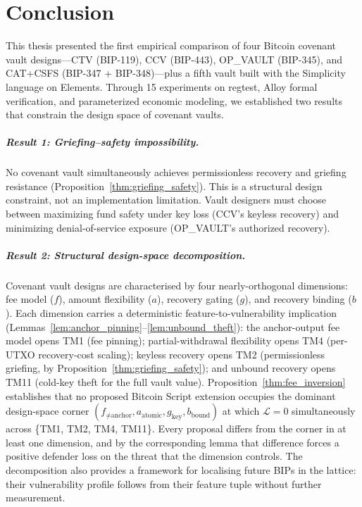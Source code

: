 \chapter{Conclusion} \label{ch:conclusion}

This thesis presented the first empirical comparison of four Bitcoin covenant vault
designs---CTV (BIP-119), CCV (BIP-443), OP\_VAULT (BIP-345), and CAT+CSFS
(BIP-347 + BIP-348)---plus a fifth vault built with the Simplicity language on
Elements. Through 15 experiments on regtest, Alloy formal verification, and
parameterized economic modeling, we established two results that constrain the
design space of covenant vaults.

\paragraph{Result 1: Griefing--safety impossibility.}
No covenant vault simultaneously achieves permissionless recovery and griefing
resistance (Proposition~\ref{thm:griefing_safety}). This is a structural design
constraint, not an implementation limitation. Vault designers must choose between
maximizing fund safety under key loss (CCV's keyless recovery) and minimizing
denial-of-service exposure (OP\_VAULT's authorized recovery).

\paragraph{Result 2: Structural design-space decomposition.}
Covenant vault designs are characterised by four nearly-orthogonal
dimensions: fee model ($f$), amount flexibility ($a$), recovery
gating ($g$), and recovery binding ($b$). Each dimension carries a
deterministic feature-to-vulnerability implication
(Lemmas~\ref{lem:anchor_pinning}--\ref{lem:unbound_theft}): the
anchor-output fee model opens TM1 (fee pinning); partial-withdrawal
flexibility opens TM4 (per-UTXO recovery-cost scaling); keyless recovery
opens TM2 (permissionless griefing, by
Proposition~\ref{thm:griefing_safety}); and unbound recovery opens
TM11 (cold-key theft for the full vault value).
Proposition~\ref{thm:fee_inversion} establishes that no proposed
Bitcoin Script extension occupies the dominant design-space corner
$(f_{\neq\text{anchor}}, a_{\text{atomic}}, g_{\text{key}},
b_{\text{bound}})$ at which $\mathcal{L} = 0$ simultaneously across
\{TM1, TM2, TM4, TM11\}. Every proposal differs from the corner in
at least one dimension, and by the corresponding lemma that
difference forces a positive defender loss on the threat that the
dimension controls. The decomposition also provides a framework for
localising future BIPs in the lattice: their vulnerability profile
follows from their feature tuple without further measurement.

